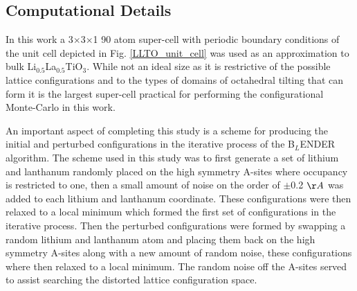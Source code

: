 \documentclass[aps,pre,reprint,superscriptaddress,showkeys]{revtex4-2}
\begin{document}
\subsection{Computational Details}
In this work a 3$\times$3$\times$1 90 atom super-cell with periodic boundary conditions of the unit cell depicted in Fig. \ref{LLTO_unit_cell} was used as an approximation to bulk Li$_{0.5}$La$_{0.5}$TiO$_{3}$. While not an ideal size as it is  restrictive of the possible lattice configurations and to the types of domains of octahedral tilting that can form it is the largest super-cell practical for performing the configurational Monte-Carlo in this work. 

An important aspect of completing this study is a scheme for producing the initial and perturbed configurations in the iterative process of the B$_L$ENDER algorithm. The scheme used in this study was to first generate a set of lithium and lanthanum randomly placed on the high symmetry A-sites where occupancy is restricted to one, then a small amount of noise on the order of $\pm$0.2 $\AA$ was added to each lithium and lanthanum coordinate. These configurations were then relaxed to a local minimum which formed the first set of configurations in the iterative process.  Then the perturbed configurations  were formed by swapping a random lithium and lanthanum atom and placing them back on the high symmetry A-sites along with a new amount of random noise, these configurations where then relaxed to a local minimum. The random noise off the A-sites served to assist searching the distorted lattice configuration space. 
\end{document}
